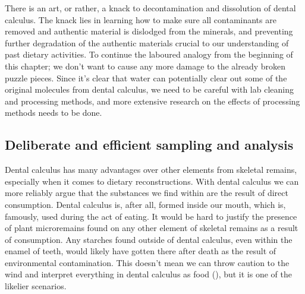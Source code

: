 \documentclass[
  b5paper,
]{book}
\begin{document}
There is an art, or rather, a knack to decontamination and dissolution
of dental calculus. The knack lies in learning how to make sure all
contaminants are removed and authentic material is dislodged from the
minerals, and preventing further degradation of the authentic materials
crucial to our understanding of past dietary activities. To continue the
laboured analogy from the beginning of this chapter; we don't want to
cause any more damage to the already broken puzzle pieces. Since it's
clear that water can potentially clear out some of the original
molecules from dental calculus, we need to be careful with lab cleaning
and processing methods, and more extensive research on the effects of
processing methods needs to be done.

\subsection{Deliberate and efficient sampling and
analysis}\label{deliberate-and-efficient-sampling-and-analysis}

Dental calculus has many advantages over other elements from skeletal
remains, especially when it comes to dietary reconstructions. With
dental calculus we can more reliably argue that the substances we find
within are the result of direct consumption. Dental calculus is, after
all, formed inside our mouth, which is, famously, used during the act of
eating. It would be hard to justify the presence of plant microremains
found on any other element of skeletal remains as a result of
consumption. Any starches found outside of dental calculus, even within
the enamel of teeth, would likely have gotten there after death as the
result of environmental contamination. This doesn't mean we can throw
caution to the wind and interpret everything in dental calculus as food
(), but it is
one of the likelier scenarios.
\end{document}
